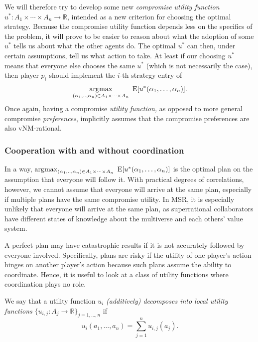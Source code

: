We will therefore try to develop some new \emph{compromise utility
function} \(u^{*}\colon A_{1} \times \dotsm \times A_{n} \rightarrow \mathbb{R}\),
intended as a new criterion for choosing the optimal strategy. Because
the compromise utility function depends less on the specifics of the
problem, it will prove to be easier to reason about what the adoption of
some \(u^{*}\) tells us about what the other agents do. The optimal
\(u^{*}\) can then, under certain assumptions, tell us what action to
take. At least if our choosing \(u^{*}\) means that everyone else
chooses the same \(u^{*}\) (which is not necessarily the case), then
player \(p_{i}\) should implement the \(i\)-th strategy entry of
$$
\operatorname*{\arg\!\max}_{(\alpha_{1},..,\alpha_{n}) \in A_{1} \times \dotsm \times A_{n}}\ \mathrm{E}\lbrack u^{*}(\alpha_{1},\dotsc,\alpha_{n})\rbrack.
$$
Once again, having a compromise \emph{utility function,} as opposed to
more general compromise \emph{preferences}, implicitly assumes that the
compromise preferences are also vNM-rational.

\hypertarget{cooperation-with-and-without-coordination}{\subsubsection{Cooperation
with and without
coordination}\label{cooperation-with-and-without-coordination}}

In a way, \(\operatorname*{\arg\!\max}_{(\alpha_{1},..,\alpha_{n}) \in A_{1} \times \dotsm \times A_{n}}\
\mathrm{E}\lbrack u^{*}(\alpha_{1},\dotsc,\alpha_{n})\rbrack\) is the optimal plan on the assumption
that everyone will follow it. With practical degrees of correlations, however, we cannot assume that
everyone will arrive at the same plan, especially if multiple plans have
the same compromise utility. In MSR, it is especially unlikely that
everyone will arrive at the same plan, as superrational collaborators
have different states of knowledge about the multiverse and each others'
value system.

A perfect plan may have catastrophic results if it is not accurately
followed by everyone involved. Specifically, plans are risky if the
utility of one player's action hinges on another player's action because
such plans assume the ability to coordinate. Hence, it is useful to look
at a class of utility functions where coordination plays no role.

We say that a utility function \(u_{i}\) \emph{(additively) decomposes
into local utility functions}
\(\{ u_{i,j}\colon A_j \rightarrow \mathbb{R}\}_{j = 1,\dotsc,n}\) if
$$
u_{i}(a_{1},\dotsc,a_{n}) = \sum_{j=1}^n u_{i,j}(a_{j}).
$$

